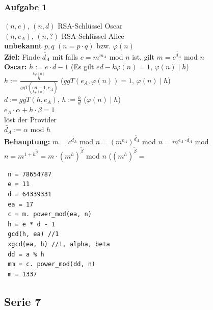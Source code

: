 \documentclass[10pt]{article}
\newcommand{\Bold}[1]{\textbf{#1}} %
\newcommand{\Oben}[2]{\overset{#1}{#2}} %
\newcommand{\Unten}[2]{\underset{#1}{#2}} %
\begin{document}
\subsubsection*{Aufgabe 1}
$(n,e)$, $(n,d)$ RSA-Schlüssel Oscar\\
$(n,e_A)$, $(n,?)$ RSA-Schlüssel Alice\\
\Bold{unbekannt} $p,q$ $(n=p\cdot q)$ bzw. $\varphi(n)$\\
\Bold{Ziel:} Finde $\tilde{d_A}$ mit falls $c=m^{m_A}$ mod $n$ ist, gilt $m=c^{\tilde{d_A}}$ mod $n$\\
\Bold{Oscar:} $h:=e\cdot d-1$ (Es gilt $ed-k\varphi(n)=1$, $\varphi(n)\mid h$)\\
$h:=\frac{\Oben{k\varphi(n)}{h}}{ggT(\Unten{k\varphi(n)}{ed-1},e_A)}$ \hspace*{2cm}($ggT(e_A,\varphi(n))=1$, $\varphi(n)\mid h$)\\
$d:=ggT(h,e_A)$, $h:=\frac{h}{d}$ \hspace*{2cm}($\varphi(n)\mid h$)\\
$e_A\cdot\alpha+h\cdot\beta=1$\\
 löst der Provider\\
$\tilde{d_A}:=\alpha$ mod $h$\\
\Bold{Behauptung:} $m = c^{\tilde{d_A}}$ mod $n=(m^{e_A})^{\tilde{d_A}}$ mod $n=m^{e_A\cdot \tilde{d_A}}$ mod $n=m^{1+h^{\tilde{\beta}}}=m\cdot (m^h)^{\tilde{\beta}}$ mod $n$ ($(m^h)^{\tilde{\beta}} = $
\begin{lstlisting}
 n = 78654787
 e = 11
 d = 64339331
 ea = 17
 c = m. power_mod(ea, n)
 h = e * d - 1
 gcd(h, ea) //1
 xgcd(ea, h) //1, alpha, beta
 dd = a % h
 mm = c. power_mod(dd, n)
 m = 1337
\end{lstlisting}

\subsection*{Serie 7}
\end{document}
